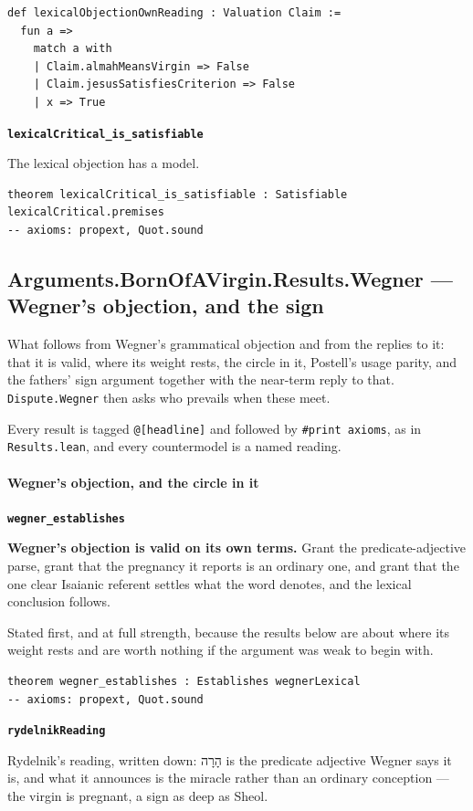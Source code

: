 \documentclass[11pt]{article}
\begin{document}
{\small\begin{verbatim}
def lexicalObjectionOwnReading : Valuation Claim :=
  fun a =>
    match a with
    | Claim.almahMeansVirgin => False
    | Claim.jesusSatisfiesCriterion => False
    | x => True
\end{verbatim}}
\par\medskip\noindent\textbf{\texttt{lexical\allowbreak{}Critical\_\allowbreak{}is\_\allowbreak{}satisfiable}}\par\nobreak\noindent
The lexical objection has a model.

{\small\begin{verbatim}
theorem lexicalCritical_is_satisfiable : Satisfiable lexicalCritical.premises
-- axioms: propext, Quot.sound
\end{verbatim}}
\subsection*{Arguments.BornOfAVirgin.Results.Wegner — Wegner's objection, and the sign}
What follows from Wegner's grammatical objection and from the replies to it: that it is valid, where its weight rests, the circle in it, Postell's usage parity, and the fathers' sign argument together with the near-term reply to that. \texttt{Dispute.Wegner} then asks who prevails when these meet.

Every result is tagged \texttt{@[headline]} and followed by \texttt{\#print axioms}, as in \texttt{Results.lean}, and every countermodel is a named reading.

\paragraph*{Wegner's objection, and the circle in it}
\leavevmode\par
\par\medskip\noindent\textbf{\texttt{wegner\_\allowbreak{}establishes}}\par\nobreak\noindent
\textbf{Wegner's objection is valid on its own terms.} Grant the predicate-adjective parse, grant that the pregnancy it reports is an ordinary one, and grant that the one clear Isaianic referent settles what the word denotes, and the lexical conclusion follows.

Stated first, and at full strength, because the results below are about where its weight rests and are worth nothing if the argument was weak to begin with.

{\small\begin{verbatim}
theorem wegner_establishes : Establishes wegnerLexical
-- axioms: propext, Quot.sound
\end{verbatim}}
\par\medskip\noindent\textbf{\texttt{rydelnik\allowbreak{}Reading}}\par\nobreak\noindent
Rydelnik's reading, written down: הָרָה is the predicate adjective Wegner says it is, and what it announces is the miracle rather than an ordinary conception — the virgin is pregnant, a sign as deep as Sheol.
\end{document}
